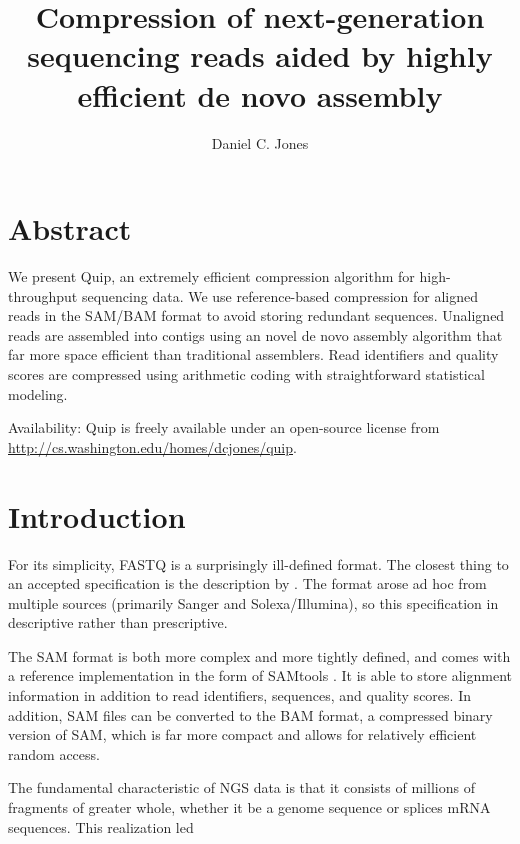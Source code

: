 \documentclass[twocolumn]{article}
\title{Compression of next-generation sequencing reads aided by highly efficient de novo assembly}
\author{Daniel C. Jones}
\begin{document}
\maketitle

\section{Abstract}

We present Quip, an extremely efficient compression algorithm for
high-throughput sequencing data.  We use reference-based compression for aligned
reads in the SAM/BAM format to avoid storing redundant sequences.  Unaligned
reads are assembled into contigs using an novel de novo assembly algorithm that
far more space efficient than traditional assemblers.  Read identifiers and
quality scores are compressed using arithmetic coding with straightforward
statistical modeling.

Availability: Quip is freely available under an open-source license from
\url{http://cs.washington.edu/homes/dcjones/quip}.


\section{Introduction}




For its simplicity, FASTQ is a surprisingly ill-defined format. The closest
thing to an accepted specification is the description by \citet{Cock2010}. The
format arose ad hoc from multiple sources (primarily Sanger and
Solexa/Illumina), so this specification in descriptive rather than
prescriptive.

The SAM format is both more complex and more tightly defined, and comes with a
reference implementation in the form of SAMtools \citep{Li2009b}. It is able to
store alignment information in addition to read identifiers, sequences, and
quality scores. In addition, SAM files can be converted to the BAM format, a
compressed binary version of SAM, which is far more compact and allows for
relatively efficient random access. 




The fundamental characteristic of NGS data is that it consists of millions of
fragments of greater whole, whether it be a genome sequence or splices mRNA
sequences. This realization led \cite{Hsi-YangFritz2011}
\end{document}
